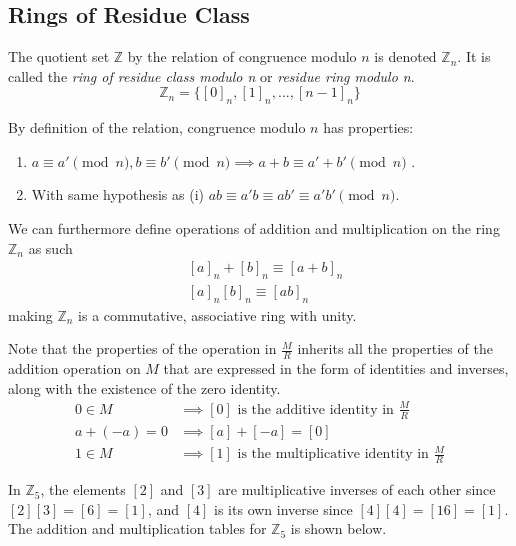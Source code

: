 \documentclass{article}
\begin{document}
  \subsection{Rings of Residue Class}

    \begin{definition}
      The quotient set $\mathbb{Z}$ by the relation of congruence modulo $n$ is denoted $\mathbb{Z}_{n}$. It is called the \textit{ring of residue class modulo n} or \textit{residue ring modulo n}. 
      \[ \mathbb{Z}_{n} = \{ [0]_{n}, [1]_{n}, ... , [n-1]_{n} \} \]
    \end{definition}

    By definition of the relation, congruence modulo $n$ has properties: 
    \begin{enumerate}
      \item $a \equiv a' \pmod{n}, b \equiv b' \pmod{n} \implies a + b \equiv a' + b' \pmod{n}$ . 
      \item With same hypothesis as (i) $a b \equiv a' b \equiv a b' \equiv a' b' \pmod{n}$. 
    \end{enumerate}
    We can furthermore define operations of addition and multiplication on the ring $\mathbb{Z}_{n}$ as such 
    \begin{align*}
      & [a]_{n} + [b]_{n} \equiv [a + b]_{n} \\
      & [a]_{n} [b]_{n} \equiv [ab]_{n}
    \end{align*}
    making $\mathbb{Z}_{n}$ is a commutative, associative ring with unity. 

    Note that the properties of the operation in $\frac{M}{R}$ inherits all the properties of the addition operation on $M$ that are expressed in the form of identities and inverses, along with the existence of the zero identity. 
    \begin{align*}
      0 \in M & \implies [0] \text{ is the additive identity in } \frac{M}{R} \\
      a + (-a) = 0 & \implies [a] + [-a] = [0] \\
      1 \in M & \implies [1] \text{ is the multiplicative identity in } \frac{M}{R}
    \end{align*}

    \begin{example}
      In $\mathbb{Z}_{5}$, the elements $[2]$ and $[3]$ are multiplicative inverses of each other since $[2] [3] = [6] = [1]$, and $[4]$ is its own inverse since $[4] [4] = [16] = [1]$. The addition and multiplication tables for $\mathbb{Z}_5$ is shown below. 
    \end{example}
\end{document}
